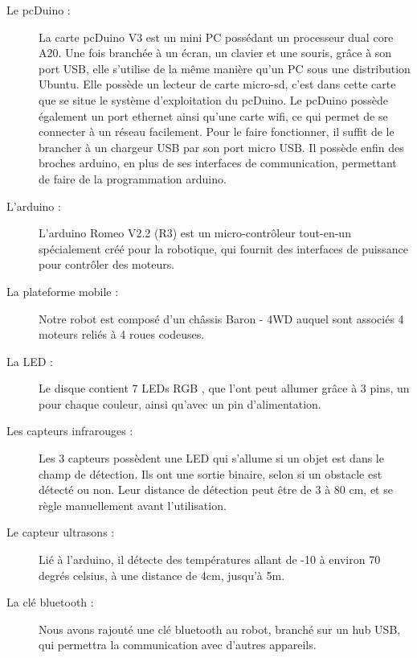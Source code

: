 \documentclass[12pt,francais]{report}
\begin{document}
\begin{description}
\item [Le pcDuino :] La carte pcDuino V3 est un mini PC possédant un processeur dual core A20. Une fois branchée à un écran, un clavier et une souris, grâce à son port USB, elle s'utilise de la même manière qu'un PC sous une distribution Ubuntu. Elle possède un lecteur de carte micro-sd,  c'est dans cette carte que se situe le système d'exploitation du pcDuino. Le pcDuino possède également un port ethernet ainsi qu'une carte wifi, ce qui permet de se connecter à un réseau facilement. Pour le faire fonctionner, il suffit de le brancher à un chargeur USB par son port micro USB. Il possède enfin des broches arduino, en plus de ses interfaces de communication, permettant de faire de la programmation arduino.\cite{ref3}
\item [L'arduino :] L'arduino Romeo V2.2 (R3) \cite{ref4} est un micro-contrôleur tout-en-un spécialement créé pour la robotique, qui fournit des interfaces de puissance pour contrôler des moteurs.
\item [La plateforme mobile :] Notre robot est composé d'un châssis Baron - 4WD auquel sont associés 4 moteurs reliés à 4 roues codeuses. \cite{ref5}
\item [La LED :] Le disque contient 7 LEDs RGB \cite{ref6}, que l'ont peut allumer grâce à 3 pins, un pour chaque couleur, ainsi qu'avec un pin d'alimentation.
\item [Les capteurs infrarouges :] Les 3 capteurs possèdent une LED qui s'allume si un objet est dans le champ de détection. Ils ont une sortie binaire, selon si un obstacle est détecté ou non. Leur distance de détection peut être de 3 à 80 cm, et se règle manuellement avant l'utilisation. \cite{ref7}
\item [Le capteur ultrasons :] Lié à l'arduino, il détecte des températures allant de -10 à environ 70 degrés celsius, à une distance de 4cm, jusqu'à 5m. \cite{ref8}
\item [La clé bluetooth :] Nous avons rajouté une clé bluetooth au robot, branché sur un hub USB, qui permettra la communication avec d'autres appareils.
\end{description}
\end{document}
